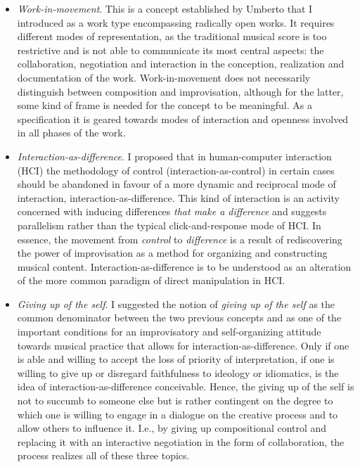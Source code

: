 \documentclass[a4paper]{article}
\begin{document}
\begin{itemize}
\item \emph{Work-in-movement}. This is a concept established by Umberto \citet{eco68} that I introduced as a work type encompassing radically open works. It requires different modes of representation, as the traditional musical score is too restrictive and is not able to communicate its most central aspects: the collaboration, negotiation and interaction in the conception, realization and documentation of the work. Work-in-movement does not necessarily distinguish between composition and improvisation, although for the latter, some kind of frame is needed for the concept to be meaningful. As a specification it is geared towards modes of interaction and openness involved in all phases of the work.

\item \emph{Interaction-as-difference}. I proposed that in human-computer interaction (HCI) the methodology of control (interaction-as-control) in certain cases should be abandoned in favour of a more dynamic and reciprocal mode of interaction, interaction-as-difference. This kind of interaction is an activity concerned with inducing differences \emph{that make a difference} \citep{bateson72:steps} and suggests parallelism rather than the typical click-and-response mode of HCI. In essence, the movement from \emph{control} to \emph{difference} is a result of rediscovering the power of improvisation as a method for organizing and constructing musical content. Interaction-as-difference is to be understood as an alteration of the more common paradigm of direct manipulation in HCI.
 
\item \emph{Giving up of the self}. I suggested the notion of \emph{giving up of the self} as the common denominator between the two previous concepts and as one of the important conditions for an improvisatory and self-organizing attitude towards musical practice that allows for interaction-as-difference. Only if one is able and willing to accept the loss of priority of interpretation, if one is willing to give up or disregard faithfulness to ideology or idiomatics, is the idea of interaction-as-difference conceivable. Hence, the giving up of the self is not to succumb to someone else but is rather contingent on the degree to which one is willing to engage in a dialogue on the creative process and to allow others to influence it. I.e., by giving up compositional control and replacing it with an interactive negotiation in the form of collaboration, the process realizes all of these three topics.
\end{itemize}
\end{document}

